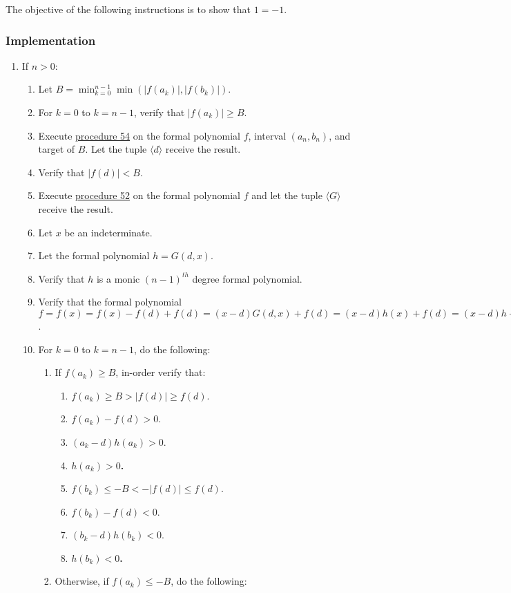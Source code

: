 \documentclass[twocolumn]{article}
\newcommand{\implementation}{\subsubsection*{Implementation}}
\begin{document}
				The objective of the following instructions is to show that $1=-1$.
			\implementation
				\begin{enumerate}
					\item If $n>0$:
					\begin{enumerate}
						\item Let $B=\min_{k=0}^{n-1}\min(\lvert f(a_k)\rvert,\lvert f(b_k)\rvert)$.
						\item For $k=0$ to $k=n-1$, verify that $\lvert f(a_k)\rvert\ge B$.
						\item Execute \hyperref[sec:procedure 54]{procedure 54} on the formal polynomial $f$, interval $(a_n, b_n)$, and target of $B$. Let the tuple $\langle d\rangle$ receive the result.
						\item Verify that $\lvert f(d)\rvert<B$.
						\item Execute \hyperref[sec:procedure 52]{procedure 52} on the formal polynomial $f$ and let the tuple $\langle G\rangle$ receive the result.
						\item Let $x$ be an indeterminate.
						\item Let the formal polynomial $h=G(d,x)$.
						\item Verify that $h$ is a monic $(n-1)^{th}$ degree formal polynomial.
						\item Verify that the formal polynomial $f=f(x)=f(x)-f(d)+f(d)=(x-d)G(d,x)+f(d)=(x-d)h(x)+f(d)=(x-d)h+f(d)$.
						\item For $k=0$ to $k=n-1$, do the following:
						\begin{enumerate}
							\item If $f(a_k)\ge B$, in-order verify that:
							\begin{enumerate}
								\item $f(a_k)\ge B>\lvert f(d)\rvert\ge f(d)$.
								\item $f(a_k)-f(d)>0$.
								\item $(a_k-d)h(a_k)>0$.
								\item \textbf{$h(a_k)>0$.}
								\item $f(b_k)\le-B<-\lvert f(d)\rvert\le f(d)$.
								\item $f(b_k)-f(d)<0$.
								\item $(b_k-d)h(b_k)<0$.
								\item \textbf{$h(b_k)<0$.}
							\end{enumerate}
							\item Otherwise, if $f(a_k)\le -B$, do the following:
							\begin{enumerate}

\end{enumerate}
\end{enumerate}
\end{enumerate}
\end{enumerate}
\end{document}
